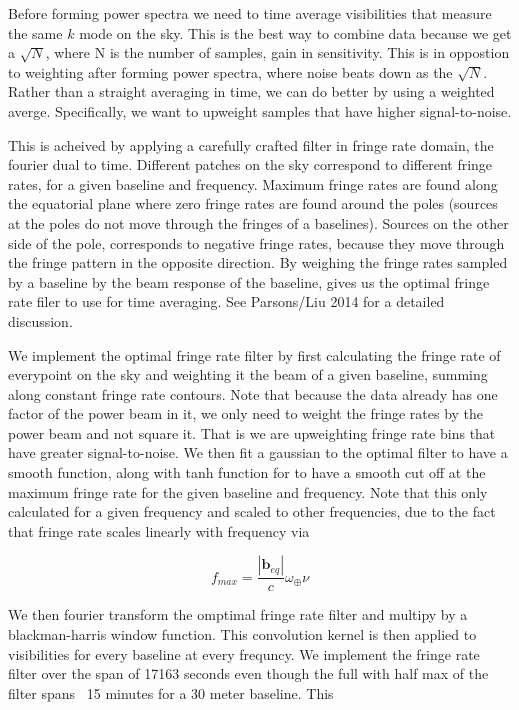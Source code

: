 \documentclass[twocolumn,numberedappendix]{emulateapj}
\begin{document}
Before forming power spectra we need to time average visibilities that measure
the same $k$ mode on the sky. This is the best way to combine data because we
get a $\sqrt{N}$, where N is the number of samples, gain in sensitivity. This is
in oppostion to weighting after forming power spectra, where noise beats down as
the $\sqrt{N}$. Rather than a straight averaging in time, we can do better by
using a weighted averge. Specifically, we want to upweight samples that have
higher signal-to-noise. 

This is acheived by applying a carefully crafted filter in fringe rate domain,
the fourier dual to time. Different patches on the sky correspond to different
fringe rates, for a given baseline and frequency. Maximum fringe rates are found
along the equatorial plane where zero fringe rates are found around the poles
(sources at the poles do not move through the fringes of a baselines). Sources
on the other side of the pole, corresponds to negative fringe rates, because
they move through the fringe pattern in the opposite direction. By weighing the
fringe rates sampled by a baseline by the beam response of the baseline, gives
us the optimal fringe rate filer to use for time averaging. See Parsons/Liu 2014
for a detailed discussion.

We implement the optimal fringe rate filter by first calculating the fringe rate
of everypoint on the sky and weighting it the beam of a given baseline, summing
along constant fringe rate contours. Note that because the data already has one
factor of the power beam in it, we only need to weight the fringe rates by the
power beam and not square it. That is we are upweighting fringe rate bins that
have greater signal-to-noise.  We then fit a gaussian to the optimal filter to
have a smooth function, along with tanh function for to have a smooth cut off
at the maximum fringe rate for the given baseline and frequency.  Note that
this only calculated for a given frequency and scaled to other frequencies, due
to the fact that fringe rate scales linearly with frequency via

\begin{equation}
    f_{max} = \frac{|\mathbf{b}_{eq}|}{c}\omega_{\oplus}\nu
\end{equation}


We then fourier transform the omptimal fringe rate filter and multipy by a
blackman-harris window function. This convolution kernel is then applied to 
visibilities for every baseline at every frequncy. We implement the fringe rate
filter over the span of 17163 seconds even though the full with half max of the
filter spans ~15 minutes for a 30 meter baseline. This 
\end{document}
